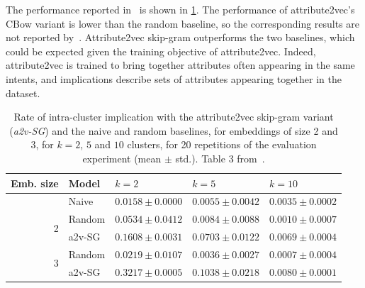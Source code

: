 The performance reported in~\cite{fca2vec:2019:durrschnabel} is shown in \cref{tab:fca2vec-a2v-perf}.
The performance of {attribute2vec}'s CBow variant is lower than the random baseline, so the corresponding results are not reported by~\cite{fca2vec:2019:durrschnabel}. 
{Attribute2vec} skip-gram outperforms the two baselines, which could be expected given the training objective of attribute2vec.
Indeed, attribute2vec is trained to bring together attributes often appearing in the same intents, and implications describe sets of attributes appearing together in the dataset.

\begin{table}
    \centering
    \begin{tabular}{rllll}
    \toprule
    Emb. size & Model & $k = 2$ & $k = 5$ & $k = 10$ \\
    \midrule
    & Naive & $0.0158\pm0.0000$ & $0.0055\pm0.0042$ & $0.0035\pm0.0002$\\
    \midrule
    \multirow{2}{*}{2} & Random & $0.0534\pm0.0412$ & $0.0084\pm0.0088$ & $0.0010\pm0.0007$ \\
    & a2v-SG & $0.1608\pm0.0031$ & $0.0703\pm0.0122$ & $0.0069\pm0.0004$ \\
    \midrule
    \multirow{2}{*}{3} & Random  & $0.0219\pm0.0107$ & $0.0036\pm0.0027$ & $0.0007\pm0.0004$ \\
    & a2v-SG & $0.3217\pm0.0005$ & $0.1038\pm0.0218$ & $0.0080\pm0.0001$ \\
    \bottomrule
    \end{tabular}
    \caption{Rate of intra-cluster implication with the {attribute2vec} skip-gram variant (\textit{a2v-SG}) and the {naive} and {random} baselines, for embeddings of size 2 and 3, for $k=2$, $5$ and $10$ clusters, for 20 repetitions of the evaluation experiment (mean $\pm$ std.). Table 3 from~\cite{fca2vec:2019:durrschnabel}.}
    \label{tab:fca2vec-a2v-perf}
\end{table}


